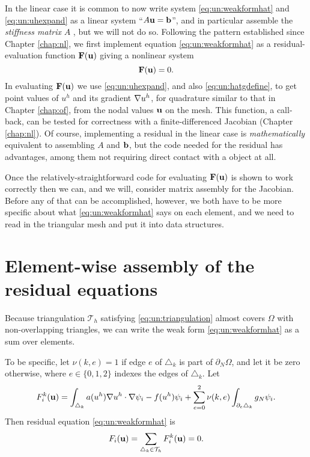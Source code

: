 In the linear case it is common to now write system \eqref{eq:un:weakformhat} and \eqref{eq:un:uhexpand} as a linear system ``$A \mathbf{u} = \mathbf{b}$'', and in particular assemble the \emph{stiffness matrix} $A$ \citep{Elmanetal2005}, but we will not do so.  Following the pattern established since Chapter \ref{chap:nl}, we first implement equation \eqref{eq:un:weakformhat} as a residual-evaluation function $\mathbf{F}(\mathbf{u})$ giving a nonlinear system
\begin{equation*}
\mathbf{F}(\mathbf{u}) = 0.
\end{equation*}
In evaluating $\mathbf{F}(\mathbf{u})$ we use \eqref{eq:un:uhexpand}, and also \eqref{eq:un:hatgdefine}, to get point values of $u^h$ and its gradient $\nabla u^h$, for quadrature similar to that in Chapter \ref{chap:of}, from the nodal values $\mathbf{u}$ on the mesh.  This function, a \pSNES call-back, can be tested for correctness with a finite-differenced Jacobian (Chapter \ref{chap:nl}).  Of course, implementing a residual in the linear case is \emph{mathematically} equivalent to assembling $A$ and $\mathbf{b}$, but the code needed for the residual has advantages, among them not requiring direct contact with a \pMat object at all.

Once the relatively-straightforward code for evaluating $\mathbf{F}(\mathbf{u})$ is shown to work correctly then we can, and we will, consider matrix assembly for the Jacobian.  Before any of that can be accomplished, however, we both have to be more specific about what \eqref{eq:un:weakformhat} says on each element, and we need to read in the triangular mesh and put it into \PETSc data structures.


\section{Element-wise assembly of the residual equations}

Because triangulation $\mathcal{T}_h$ satisfying \eqref{eq:un:triangulation} almost covers $\Omega$ with non-overlapping triangles, we can write the weak form \eqref{eq:un:weakformhat} as a sum over elements.

To be specific, let $\nu(k,e)=1$ if edge $e$ of $\triangle_k$ is part of $\partial_N\Omega$, and let it be zero otherwise, where $e\in\{0,1,2\}$ indexes the edges of $\triangle_k$.  Let
\begin{equation}
F_i^k(\mathbf{u}) = \int_{\triangle_k} a(u^h) \nabla u^h \cdot \nabla \psi_i - f(u^h) \psi_i + \sum_{e=0}^2 \nu(k,e) \int_{\partial_e \triangle_k} g_N \psi_i.  \label{eq:un:elementweakform}
\end{equation}
Then residual equation \eqref{eq:un:weakformhat} is
\begin{equation}
F_i(\mathbf{u}) = \sum_{\triangle_k \in \mathcal{T}_h} F_i^k(\mathbf{u}) = 0.  \label{eq:un:elementwisesum}
\end{equation}

